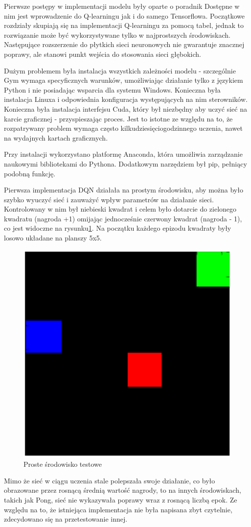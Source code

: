 \documentclass[preprint,12pt]{elsarticle}
\begin{document}
Pierwsze postępy w implementacji modelu były oparte o poradnik \cite{implementation1} Dostępne w nim jest wprowadzenie do Q-learningu jak i do samego Tensorflowa. Początkowe rozdziały skupiają się na implementacji Q-learningu za pomocą tabel, jednak to rozwiązanie może być wykorzystywane tylko w najprostszych środowiskach. Następujące rozszerzenie do płytkich sieci neuronowych nie gwarantuje znacznej poprawy, ale stanowi punkt wejścia do stosowania sieci głębokich.

Dużym problemem była instalacja wszystkich zależności modelu - szczególnie Gym wymaga specyficznych warunków, umożliwiając działanie tylko z językiem Python i nie posiadając wsparcia dla systemu Windows. Konieczna była instalacja Linuxa i odpowiednia konfiguracja występujących na nim sterowników. Konieczna była instalacja interfejsu Cuda, który był niezbędny aby uczyć sieć na karcie graficznej - przyspieszając proces. Jest to istotne ze względu na to, że rozpatrywany problem wymaga często kilkudziesięciogodzinnego uczenia, nawet na wydajnych kartach graficznych. 

Przy instalacji wykorzystano platformę Anaconda, która umożliwia zarządzanie naukowymi bibliotekami do Pythona. Dodatkowym narzędziem był pip, pełniący podobną funkcję. 

Pierwsza implementacja DQN działała na prostym środowisku, aby można było szybko wyuczyć sieć i zauważyć wpływ parametrów na działanie sieci. Kontrolowany w nim był niebieski kwadrat i celem było dotarcie do zielonego kwadratu (nagroda +1) omijając jednocześnie czerwony kwadrat (nagroda - 1), co jest widoczne na rysunku\ref{proste}. Na początku każdego epizodu kwadraty były losowo układane na planszy 5x5.

\begin{figure}[h]
\centering
\includegraphics[width=0.4\linewidth]{testing.png}
\caption{Proste środowisko testowe}
\label{proste}
\end{figure}


Mimo że sieć w ciągu uczenia stale polepszała swoje działanie, co było obrazowane przez rosnącą średnią wartość nagrody, to na innych środowiskach, takich jak Pong, sieć nie wykazywała poprawy wraz z rosnącą liczbą epok. Ze względu na to, że istniejąca implementacja nie była napisana zbyt czytelnie, zdecydowano się na przetestowanie innej.
\end{document}
